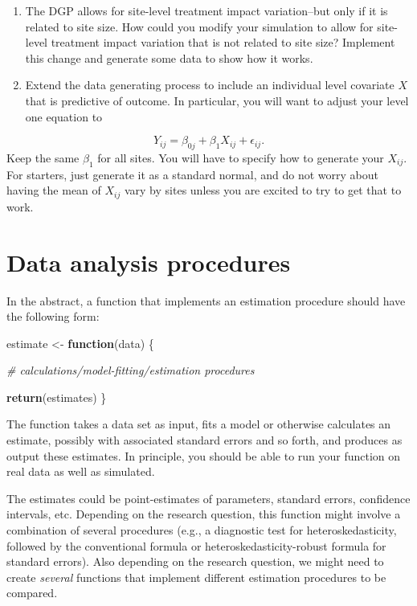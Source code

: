 \documentclass[
]{book}
\newenvironment{Shaded}{\begin{snugshade}}{\end{snugshade}}
\newcommand{\CommentTok}[1]{\textcolor[rgb]{0.56,0.35,0.01}{\textit{#1}}}
\newcommand{\ControlFlowTok}[1]{\textcolor[rgb]{0.13,0.29,0.53}{\textbf{#1}}}
\newcommand{\FunctionTok}[1]{\textcolor[rgb]{0.13,0.29,0.53}{\textbf{#1}}}
\newcommand{\NormalTok}[1]{#1}
\newcommand{\OtherTok}[1]{\textcolor[rgb]{0.56,0.35,0.01}{#1}}
\begin{document}
\begin{enumerate}
\def\labelenumi{\arabic{enumi}.}
\setcounter{enumi}{5}
\item
  The DGP allows for site-level treatment impact variation--but only if it is related to site size. How could you modify your simulation to allow for site-level treatment impact variation that is not related to site size? Implement this change and generate some data to show how it works.
\item
  Extend the data generating process to include an individual level covariate \(X\) that is predictive of outcome. In particular, you will want to adjust your level one equation to
\end{enumerate}

\[ Y_{ij} = \beta_{0j} + \beta_{1} X_{ij} + \epsilon_{ij} . \]
Keep the same \(\beta_1\) for all sites.
You will have to specify how to generate your \(X_{ij}\).
For starters, just generate it as a standard normal, and do not worry about having the mean of \(X_{ij}\) vary by sites unless you are excited to try to get that to work.

\chapter{Data analysis procedures}\label{data-analysis-procedures}

In the abstract, a function that implements an estimation procedure should have the following form:

\begin{Shaded}
\begin{Highlighting}[]
\NormalTok{estimate }\OtherTok{\textless{}{-}} \ControlFlowTok{function}\NormalTok{(data) \{}

  \CommentTok{\# calculations/model{-}fitting/estimation procedures}
  
  \FunctionTok{return}\NormalTok{(estimates)}
\NormalTok{\}}
\end{Highlighting}
\end{Shaded}

The function takes a data set as input, fits a model or otherwise calculates an estimate, possibly with associated standard errors and so forth, and produces as output these estimates.
In principle, you should be able to run your function on real data as well as simulated.

The estimates could be point-estimates of parameters, standard errors, confidence intervals, etc.
Depending on the research question, this function might involve a combination of several procedures (e.g., a diagnostic test for heteroskedasticity, followed by the conventional formula or heteroskedasticity-robust formula for standard errors).
Also depending on the research question, we might need to create \emph{several} functions that implement different estimation procedures to be compared.
\end{document}
